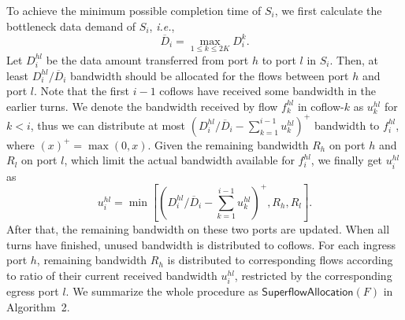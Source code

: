 \documentclass[10pt,journal,compsoc]{IEEEtran}
\begin{document}
To achieve the minimum possible completion time of $S_i$, we first calculate the bottleneck data demand of $S_i$, \emph{i.e.},
\begin{equation}
	\overline{D}_i = \max_{1\leq k\leq 2K}D_i^k.
\end{equation}
%
Let $D_i^{hl}$ be the data amount transferred from port $h$ to port $l$ in $S_i$.
%
Then, at least $D_i^{hl}/\overline{D}_i$ bandwidth should be allocated for the flows between port $h$ and port $l$.
%
Note that the first $i-1$ coflows have received some bandwidth in the earlier turns.
%
We denote the bandwidth received by flow $f_k^{hl}$ in coflow-$k$ as $u_k^{hl}$ for $k < i$, thus we can distribute at most $(D_i^{hl}/\overline{D}_i - \sum_{k=1}^{i-1}u_k^{hl})^+$ bandwidth to $f_i^{hl}$, where $(x)^+=\max(0,x)$.
%
Given the remaining bandwidth $R_h$ on port $h$ and $R_l$ on port $l$, which limit the actual bandwidth available for $f_i^{hl}$, we finally get $u_i^{hl}$ as
%
\begin{equation}
	u_i^{hl} = \min[(D_i^{hl}/\overline{D}_i - \sum_{k=1}^{i-1}u_k^{hl})^+,R_h,R_l].
\end{equation}
%
After that, the remaining bandwidth on these two ports are updated.
%
When all turns have finished, unused bandwidth is distributed to coflows.
%
For each ingress port $h$, remaining bandwidth $R_h$ is distributed to corresponding flows according to ratio of their current received bandwidth $u_i^{hl}$, restricted by the corresponding egress port $l$.
%
We summarize the whole procedure as $\mathsf{SuperflowAllocation}(F)$ in Algorithm~2.
\end{document}
